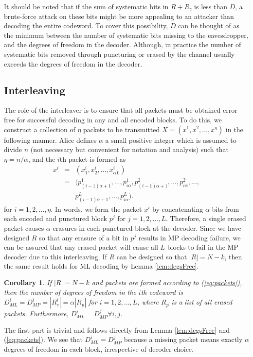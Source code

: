 \documentclass[10pt,twocolumn,twoside]{IEEEtran} \newlength{\pic}
\newtheorem{corollary}{Corollary}
\theoremstyle{definition}
\theoremstyle{remark}
\theoremstyle{plain}
\begin{document}
It should be noted that if the sum of systematic bits in $R+R_c$ is less than $D$, a brute-force attack on these bits might be more appealing to an attacker than decoding the entire codeword. To cover this possibility, $D$ can be thought of as the minimum between the number of systematic bits missing to the eavesdropper, and the degrees of freedom in the decoder. Although, in practice the number of systematic bits removed through puncturing or erased by the channel usually exceeds the degrees of freedom in the decoder.

\subsection{Interleaving}\label{subsec:interleaving}

The role of the interleaver is to ensure that all packets must be obtained error-free for successful decoding in any and all encoded blocks. To do this, we construct a collection of $\eta$ packets to be transmitted $X = (x^1, x^2, \ldots, x^\eta)$ in the following manner. Alice defines $\alpha$ a small positive integer which is assumed to divide $n$ (not necessary but convenient for notation and analysis) such that $\eta = n/\alpha$, and the $i$th packet is formed as
\begin{eqnarray}\label{eq:packets}
  x^i &=& (x^i_1,x^i_2,\ldots,x^i_{\alpha L}) \nonumber \\ &=&(p^1_{(i-1)\alpha+1},\ldots,p^1_{i\alpha}, p^2_{(i-1)\alpha+1},\ldots,p^2_{i\alpha},\ldots, \nonumber \\
  &&p^L_{(i-1)\alpha+1},\ldots,p^L_{i\alpha}).
\end{eqnarray}
for $i = 1,2,\ldots,\eta$. In words, we form the packet $x^i$ by concatenating $\alpha$ bits from each encoded and punctured block $p^j$ for $j = 1,2,\ldots,L$. Therefore, a single erased packet causes $\alpha$ erasures in each punctured block at the decoder. Since we have designed $R$ so that any erasure of a bit in $p^j$ results in MP decoding failure, we can be assured that any erased packet will cause all $L$ blocks to fail in the MP decoder due to this interleaving. If $R$ can be designed so that $|R| = N - k$, then the same result holds for ML decoding by Lemma \ref{lem:degsFree}.
\begin{corollary}\label{lem:security}
If $|R|=N-k$ and packets are formed according to (\ref{eq:packets}), then the number of degrees of freedom in the $i$th codeword is $D^i_{ML} = D^i_{MP} = |R^i_c| = \alpha |R_p|$ for $i=1,2,\ldots,L$, where $R_p$ is a list of all erased packets. Furthermore, $D^i_{ML} = D^j_{MP} \forall i,j$.
\end{corollary}
\begin{IEEEproof}
 The first part is trivial and follows directly from Lemma \ref{lem:degsFree} and (\ref{eq:packets}). We see that $D^i_{ML} = D^j_{MP}$ because a missing packet means exactly $\alpha$ degrees of freedom in each block, irrespective of decoder choice.
\end{IEEEproof}
\end{document}
